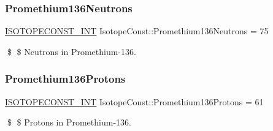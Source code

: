 \subsubsection{\texorpdfstring{Promethium136\+Neutrons}{Promethium136Neutrons}}
{\footnotesize\ttfamily \mbox{\hyperlink{group___isotope_const-_macros_ga5f18360b3e99483a35c32d789e62621c}{I\+S\+O\+T\+O\+P\+E\+C\+O\+N\+S\+T\+\_\+\+I\+NT}} Isotope\+Const\+::\+Promethium136\+Neutrons = 75}

\$ \$ Neutrons in Promethium-\/136. \mbox{\label{group___isotope_const-_promethium-_pm136_gad60062e68c18e7c9e318cfd87d1371cb}} 
\subsubsection{\texorpdfstring{Promethium136\+Protons}{Promethium136Protons}}
{\footnotesize\ttfamily \mbox{\hyperlink{group___isotope_const-_macros_ga5f18360b3e99483a35c32d789e62621c}{I\+S\+O\+T\+O\+P\+E\+C\+O\+N\+S\+T\+\_\+\+I\+NT}} Isotope\+Const\+::\+Promethium136\+Protons = 61}

\$ \$ Protons in Promethium-\/136. 